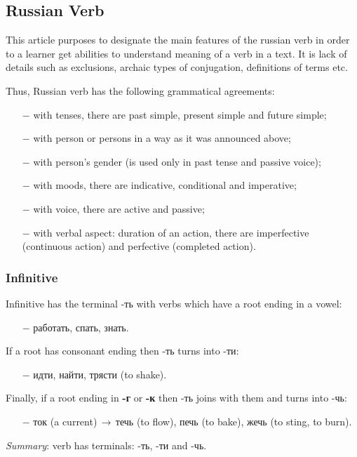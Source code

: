 \documentclass[12pt]{article}
\begin{document}
\subsection*{Russian Verb}
This article purposes to designate the main features of the russian verb in order to a learner get abilities to understand  meaning of a verb in a text. It is lack of details such as exclusions, archaic types of conjugation, definitions of terms etc.

Thus, Russian verb has the following grammatical agreements:
\begin{itemize}
\newcommand{\punkt}[1]{\item[$-$]{#1}}
\punkt{with tenses, there are past simple, present simple and future simple;}
\punkt{with person or persons in a way as it was announced above;}
\punkt{with person's gender (is used only in past tense and passive voice);}
\punkt{with moods, there are indicative, conditional and imperative;}
\punkt{with voice, there are active and passive;}
\punkt{with verbal aspect: duration of an action, there are imperfective (continuous action) and perfective (completed action).}
\end{itemize}
\subsubsection*{Infinitive}
Infinitive has the terminal \textcolor{dgreen}{-ть} with verbs which have a root ending in a vowel:  
\begin{itemize}
\vspace{-0.2cm}
\item[$-$]работ\textcolor{dgreen}{ать}, сп\textcolor{dgreen}{ать}, зн\textcolor{dgreen}{ать}.
\end{itemize}
If a root has consonant ending then \textcolor{dgreen}{-ть} turns into \textcolor{dgreen}{-ти}:
\begin{itemize}
\vspace{-0.2cm}
\item[$-$]ид\textcolor{dgreen}{ти}, най\textcolor{dgreen}{ти}, тряс\textcolor{dgreen}{ти} (to shake). 
\end{itemize}
Finally, if a root ending in \textbf{-г} or \textbf{-к} then \textcolor{dgreen}{-ть} joins with them and turns into \textcolor{dgreen}{-чь}: 
\begin{itemize}
\vspace{-0.2cm}
\item[$-$]то\textcolor{dgreen}{к} (a current)\,$ \rightarrow $\,те\textcolor{dgreen}{чь} (to flow), пе\textcolor{dgreen}{чь} (to bake), же\textcolor{dgreen}{чь} (to sting, to burn).
\end{itemize}
\textit{Summary}: verb has terminals: \textcolor{dgreen}{-ть}, \textcolor{dgreen}{-ти} and \textcolor{dgreen}{-чь}.
\end{document}
